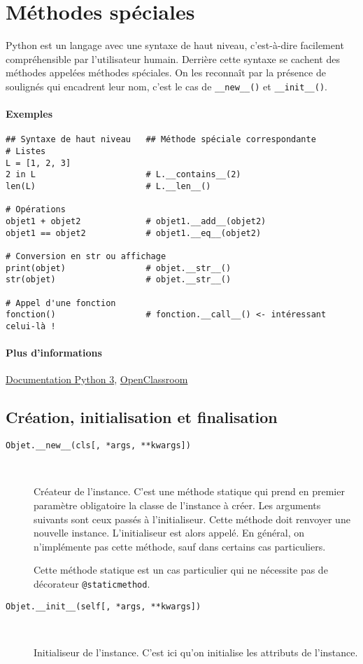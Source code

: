 \section{Méthodes spéciales}
Python est un langage avec une syntaxe de haut niveau, c'est-à-dire facilement compréhensible par l'utilisateur humain. Derrière cette syntaxe se cachent des méthodes appelées méthodes spéciales. On les reconnaît par la présence de soulignés qui encadrent leur nom, c'est le cas de \texttt{__new__()} et \texttt{__init__()}.

\paragraph{Exemples}
\begin{verbatim}
## Syntaxe de haut niveau   ## Méthode spéciale correspondante
# Listes
L = [1, 2, 3]
2 in L                      # L.__contains__(2)
len(L)                      # L.__len__()

# Opérations
objet1 + objet2             # objet1.__add__(objet2)
objet1 == objet2            # objet1.__eq__(objet2)

# Conversion en str ou affichage
print(objet)                # objet.__str__()
str(objet)                  # objet.__str__()

# Appel d'une fonction
fonction()                  # fonction.__call__() <- intéressant celui-là !
\end{verbatim}

\paragraph{Plus d'informations} \href{https://docs.python.org/3/reference/datamodel.html#specialnames}{Documentation Python 3}, \href{https://openclassrooms.com/courses/apprenez-a-programmer-en-python/les-methodes-speciales-1}{OpenClassroom}


\subsection{Création, initialisation et finalisation}
\begin{description}
    \item[\texttt{Objet.__new__(cls[, *args, **kwargs])}]~

    Créateur de l'instance. C'est une méthode statique qui prend en premier paramètre obligatoire la classe de l'instance à créer. Les arguments suivants sont ceux passés à l'initialiseur. Cette méthode doit renvoyer une nouvelle instance. L'initialiseur est alors appelé. En général, on n'implémente pas cette méthode, sauf dans certains cas particuliers.\bigskip

    Cette méthode statique est un cas particulier qui ne nécessite pas de décorateur \texttt{@staticmethod}.

    \item[\texttt{Objet.__init__(self[, *args, **kwargs])}]~

    Initialiseur de l'instance. C'est ici qu'on initialise les attributs de l'instance.
\end{description}

